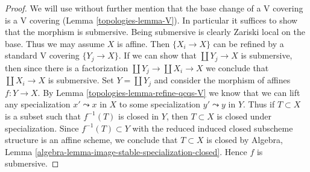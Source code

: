 \begin{proof}

We will use without further mention that the base change of a V covering
is a V covering (Lemma \ref{topologies-lemma-V}). In particular it suffices
to show that the morphism is submersive.
Being submersive is clearly Zariski local on the base.
Thus we may assume $X$ is affine. Then $\{X_i \to X\}$
can be refined by a standard V covering $\{Y_j \to X\}$.
If we can show that $\coprod Y_j \to X$ is submersive,
then since there is a factorization $\coprod Y_j \to \coprod X_i \to X$
we conclude that $\coprod X_i \to X$ is submersive.
Set $Y = \coprod Y_j$ and consider the morphism of affines
$f : Y \to X$.
By Lemma \ref{topologies-lemma-refine-qcqs-V} we know that we can lift any
specialization $x' \leadsto x$ in $X$ to some specialization
$y' \leadsto y$ in $Y$.
Thus if $T \subset X$ is a subset such that $f^{-1}(T)$
is closed in $Y$, then $T \subset X$ is closed under specialization.
Since $f^{-1}(T) \subset Y$
with the reduced induced closed subscheme structure
is an affine scheme, we conclude that $T \subset X$ is closed by
Algebra, Lemma \ref{algebra-lemma-image-stable-specialization-closed}.
Hence $f$ is submersive.
\end{proof}

